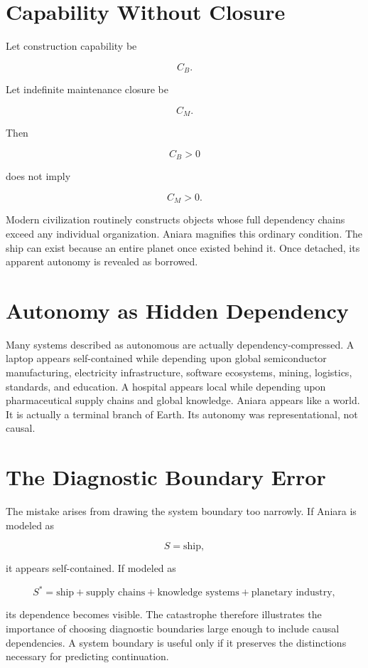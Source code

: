 \documentclass[11pt,oneside]{book}
\theoremstyle{definition}
\theoremstyle{remark}
\begin{document}
\section{Capability Without Closure}

Let construction capability be

\[
C_B.
\]

Let indefinite maintenance closure be

\[
C_M.
\]

Then

\[
C_B>0
\]

does not imply

\[
C_M>0.
\]

Modern civilization routinely constructs objects whose full dependency chains exceed any individual
organization. Aniara magnifies this ordinary condition. The ship can exist because an entire planet
once existed behind it. Once detached, its apparent autonomy is revealed as borrowed.

\section{Autonomy as Hidden Dependency}

Many systems described as autonomous are actually dependency-compressed. A laptop appears
self-contained while depending upon global semiconductor manufacturing, electricity infrastructure,
software ecosystems, mining, logistics, standards, and education. A hospital appears local while
depending upon pharmaceutical supply chains and global knowledge. Aniara appears like a world. It is
actually a terminal branch of Earth. Its autonomy was representational, not causal.

\section{The Diagnostic Boundary Error}

The mistake arises from drawing the system boundary too narrowly. If Aniara is modeled as

\[
S=\text{ship},
\]

it appears self-contained. If modeled as

\[
S^\ast = \text{ship} + \text{supply chains} + \text{knowledge systems} + \text{planetary industry},
\]

its dependence becomes visible. The catastrophe therefore illustrates the importance of choosing
diagnostic boundaries large enough to include causal dependencies. A system boundary is useful only
if it preserves the distinctions necessary for predicting continuation.
\end{document}

